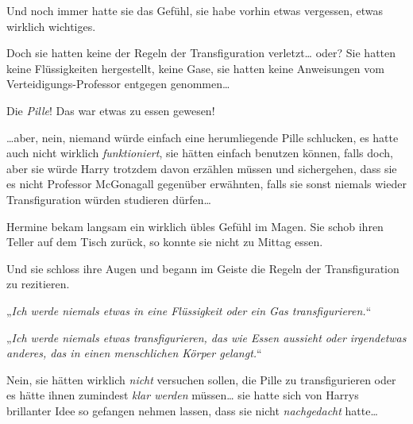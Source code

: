 Und noch immer hatte sie das Gefühl, sie habe vorhin etwas vergessen, etwas wirklich wichtiges.

Doch sie hatten keine der Regeln der Transfiguration verletzt… oder? Sie hatten keine Flüssigkeiten hergestellt, keine Gase, sie hatten keine Anweisungen vom Verteidigungs-Professor entgegen genommen…

Die \emph{Pille}! Das war etwas zu essen gewesen!

…aber, nein, niemand würde einfach eine herumliegende Pille schlucken, es hatte auch nicht wirklich \emph{funktioniert}, sie hätten einfach  benutzen können, falls doch, aber sie würde Harry trotzdem davon erzählen müssen und sichergehen, dass sie es nicht Professor McGonagall gegenüber erwähnten, falls sie sonst niemals wieder Transfiguration würden studieren dürfen…

Hermine bekam langsam ein wirklich übles Gefühl im Magen. Sie schob ihren Teller auf dem Tisch zurück, so konnte sie nicht zu Mittag essen.

Und sie schloss ihre Augen und begann im Geiste die Regeln der Transfiguration zu rezitieren.

„\emph{Ich werde niemals etwas in eine Flüssigkeit oder ein Gas transfigurieren.}“

„\emph{Ich werde niemals etwas transfigurieren, das wie Essen aussieht oder irgendetwas anderes, das in einen menschlichen Körper gelangt.}“

Nein, sie hätten wirklich \emph{nicht} versuchen sollen, die Pille zu transfigurieren oder es hätte ihnen zumindest \emph{klar werden} müssen… sie hatte sich von Harrys brillanter Idee so gefangen nehmen lassen, dass sie nicht \emph{nachgedacht} hatte…

